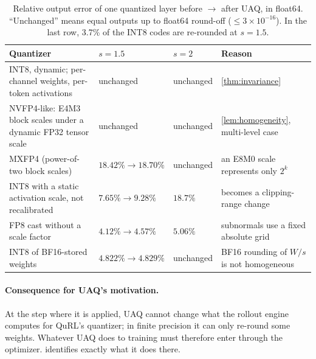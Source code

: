 \begin{table}[t]
\centering\small
\begin{tabularx}{\linewidth}{@{}L l l L@{}}
\toprule
Quantizer & $s=1.5$ & $s=2$ & Reason\\
\midrule
INT8, dynamic; per-channel weights, per-token activations & unchanged & unchanged & \cref{thm:invariance}\\
NVFP4-like: E4M3 block scales under a dynamic FP32 tensor scale & unchanged & unchanged & \cref{lem:homogeneity}, multi-level case\\
MXFP4 (power-of-two block scales) & $18.42\%\to18.70\%$ & unchanged & an E8M0 scale represents only $2^k$\\
INT8 with a static activation scale, not recalibrated & $7.65\%\to9.28\%$ & $18.7\%$ & becomes a clipping-range change\\
FP8 cast without a scale factor & $4.12\%\to4.57\%$ & $5.06\%$ & subnormals use a fixed absolute grid\\
INT8 of BF16-stored weights & $4.822\%\to4.829\%$ & unchanged & BF16 rounding of $W/s$ is not homogeneous\\
\bottomrule
\end{tabularx}
\caption{Relative output error of one quantized layer before $\to$ after UAQ, in float64. ``Unchanged'' means equal outputs up to float64 round-off ($\le3\times10^{-16}$). In the last row, 3.7\% of the INT8 codes are re-rounded at $s=1.5$.}\label{tab:scope}
\end{table}

\paragraph{Consequence for UAQ's motivation.} At the step where it is applied, UAQ cannot change what the rollout engine computes for QuRL's quantizer; in finite precision it can only re-round some weights. Whatever UAQ does to training must therefore enter through the optimizer.  identifies exactly what it does there.
